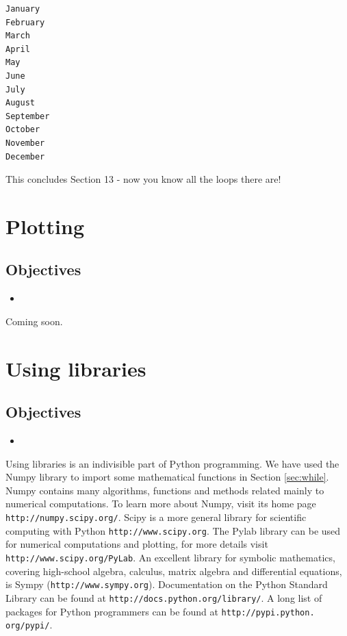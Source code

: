 \begin{verbatim}
January
February
March
April
May
June
July
August
September
October
November
December
\end{verbatim}
This concludes Section 13 - now you know all the loops there are!

\section{Plotting}

\subsection{Objectives}

\begin{itemize}
\item
\end{itemize}
Coming soon.

\section{Using libraries}\label{subsec:importinglib}

\subsection{Objectives}

\begin{itemize}
\item
\end{itemize}

Using libraries is an indivisible part of Python programming. We have 
used the Numpy library to import some mathematical functions in Section 
\ref{sec:while}. Numpy contains many algorithms, functions and methods 
related mainly to numerical computations. To learn more about Numpy,
visit its home page {\tt http://numpy.scipy.org/}. Scipy is a more 
general library for scientific computing with Python {\tt http://www.scipy.org}.
The Pylab library can be used for numerical computations and plotting,
for more details visit {\tt http://www.scipy.org/PyLab}. An excellent 
library for symbolic mathematics, covering high-school algebra, calculus,
matrix algebra and differential equations, is Sympy ({\tt http://www.sympy.org}).
Documentation on the Python Standard Library can be found at 
{\tt http://docs.python.org/library/}. A long list of packages for Python 
programmers can be found at {\tt http://pypi.python. org/pypi/}.


